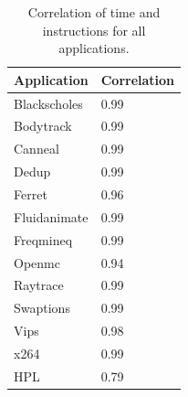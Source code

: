 \begin{table}[H]
	\centering
	\caption{Correlation of time and instructions for all applications.}
	\begin{tabular}{ll}
		\multicolumn{1}{l|}{\textbf{Application}} & \textbf{Correlation} \\ \hline
		Blackscholes                                               & 0.99                                  \\
		Bodytrack                                                  & 0.99                                  \\
		Canneal                                                    & 0.99                                  \\
		Dedup                                                      & 0.99                                  \\
		Ferret                                                     & 0.96                                  \\
		Fluidanimate                                               & 0.99                                  \\
		Freqmineq                                                  & 0.99                                  \\
		Openmc                                                     & 0.94                                  \\
		Raytrace                                                   & 0.99                                  \\
		Swaptions                                                  & 0.99                                  \\
		Vips                                                       & 0.98                                  \\
		x264                                                       & 0.99                                  \\
		HPL                                                        & 0.79                                  \\ \hline
	\end{tabular}
	\label{tab:corr_in_time}
\end{table}

